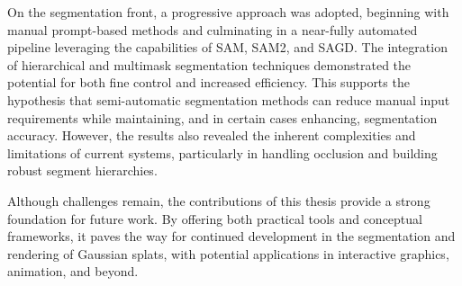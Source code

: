 \documentclass[12pt]{article}
\begin{document}
On the segmentation front, a progressive approach was adopted, beginning with manual prompt-based methods and culminating in a near-fully automated pipeline leveraging the capabilities of SAM, SAM2, and SAGD. The integration of hierarchical and multimask segmentation techniques demonstrated the potential for both fine control and increased efficiency. This supports the hypothesis that semi-automatic segmentation methods can reduce manual input requirements while maintaining, and in certain cases enhancing, segmentation accuracy. However, the results also revealed the inherent complexities and limitations of current systems, particularly in handling occlusion and building robust segment hierarchies.

Although challenges remain, the contributions of this thesis provide a strong foundation for future work. By offering both practical tools and conceptual frameworks, it paves the way for continued development in the segmentation and rendering of Gaussian splats, with potential applications in interactive graphics, animation, and beyond.
\FloatBarrier{}
\noindent\printbibliography
\end{document}
